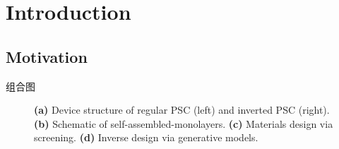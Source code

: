 \documentclass[a4paper,12pt]{mythesisclass}
\begin{document}
\chapter{Introduction}
\section{Motivation}
组合图
\begin{figure}[H]
	\centering
    \textbf{}
	\textbf{}\vfill
    \textbf{}
	\textbf{}		
	\caption{\textbf{(a)} Device structure of regular PSC (left) and inverted PSC (right).\cite{li2024self} \textbf{(b)} Schematic of self-assembled-monolayers. \textbf{(c)}  Materials design via screening. \textbf{(d)} Inverse design via generative models.}
	\label{background}
	\end{figure}
\end{document}
